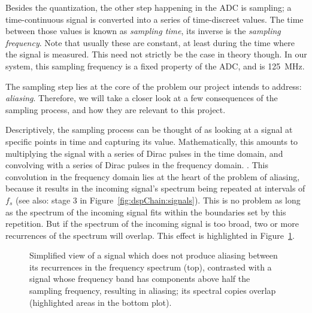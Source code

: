 Besides the quantization,  the other step happening in the  ADC is sampling; a
time-continuous signal is converted into a series of time-discreet values. The
time between those values is known as \emph{sampling time}, its inverse is the
\emph{sampling  frequency}. Note that  usually  these are  constant, at  least
during the  time where the signal  is measured. This need not  strictly be the
case  in theory  though. In our  system, this  sampling frequency  is a  fixed
property of the ADC, and is \SI{125}{\mega\hertz}.

The sampling  step lies  at the  core of  the problem  our project  intends to
address:  \emph{aliasing}. Therefore, we  will take  a  closer look  at a  few
consequences  of the  sampling  process, and  how they  are  relevant to  this
project.

Descriptively, the sampling  process can be thought of as  looking at a signal
at  specific points  in  time and  capturing  its value. Mathematically,  this
amounts to multiplying  the signal with a  series of Dirac pulses  in the time
domain,  and  convolving with  a  series  of  Dirac  pulses in  the  frequency
domain\footnotemark.
.
This  convolution  in   the  frequency  domain  lies  at  the   heart  of  the
problem   of  aliasing,   because  it   results  in   the  incoming   signal's
spectrum  being  repeated  at  intervals  of  $f_s$  (see  also:  stage  3  in
Figure~\ref{fig:dspChain:signals}). This is no problem as long as the spectrum
of the incoming signal fits within  the boundaries set by this repetition. But
if  the  spectrum   of  the  incoming  signal  is  too   broad,  two  or  more
recurrences  of  the spectrum  will  overlap. This  effect is  highlighted  in
Figure~\ref{fig:aliasing:band}.

\begin{figure}
    \centering
    
    \caption[Aliasing Illustrated via Signal Frequency Band]{%
        Simplified view  of a signal  which does not produce  aliasing between
        its recurrences  in the  frequency spectrum  (top), contrasted  with a
        signal whose  frequency band  has components  above half  the sampling
        frequency,  resulting   in  aliasing;  its  spectral   copies  overlap
        (highlighted areas in the bottom plot).%
    }
    \label{fig:aliasing:band}
\end{figure}


